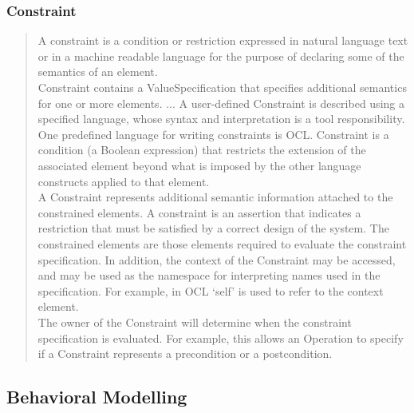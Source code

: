 \subsubsection{Constraint}

\begin{quotation}
A constraint is a condition or restriction expressed in natural language text or in a machine readable language for the
purpose of declaring some of the semantics of an element.
\\
Constraint contains a ValueSpecification that specifies additional semantics for one or more elements. 
... A user-defined
Constraint is described using a specified language, whose syntax and interpretation is a tool responsibility. One
predefined language for writing constraints is OCL. 
Constraint is a condition (a Boolean expression) that restricts the extension of the associated element beyond what is
imposed by the other language constructs applied to that element.\\

A Constraint represents additional semantic information attached to the constrained elements. A constraint is an assertion
that indicates a restriction that must be satisfied by a correct design of the system. The constrained elements are those
elements required to evaluate the constraint specification. In addition, the context of the Constraint may be accessed, and
may be used as the namespace for interpreting names used in the specification. For example, in OCL ‘self’ is used to refer
to the context element.
\\
The owner of the Constraint will determine when the constraint specification is evaluated. For example, this allows an
Operation to specify if a Constraint represents a precondition or a postcondition.\cite{UML23Superstructure}\end{quotation}

\subsection{Behavioral Modelling}
